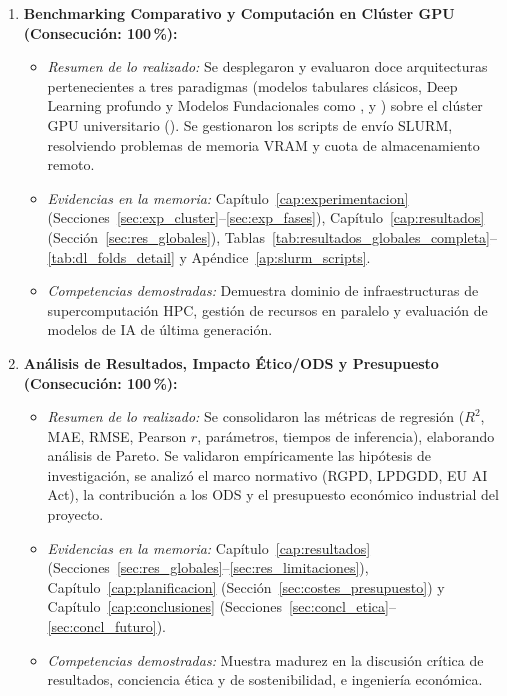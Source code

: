 \begin{enumerate}[label=\textbf{OE\arabic*.}, leftmargin=1.8cm]
    \item \textbf{Benchmarking Comparativo y Computación en Clúster GPU (Consecución: 100\,\%):}
    \begin{itemize}
        \item \textit{Resumen de lo realizado:} Se desplegaron y evaluaron doce arquitecturas pertenecientes a tres paradigmas (modelos tabulares clásicos, Deep Learning profundo y Modelos Fundacionales como \moment{}, \chronos{} y \timesfm{}) sobre el clúster GPU universitario (). Se gestionaron los scripts de envío SLURM, resolviendo problemas de memoria VRAM y cuota de almacenamiento remoto.
        \item \textit{Evidencias en la memoria:} Capítulo~\ref{cap:experimentacion} (Secciones~\ref{sec:exp_cluster}--\ref{sec:exp_fases}), Capítulo~\ref{cap:resultados} (Sección~\ref{sec:res_globales}), Tablas~\ref{tab:resultados_globales_completa}--\ref{tab:dl_folds_detail} y Apéndice~\ref{ap:slurm_scripts}.
        \item \textit{Competencias demostradas:} Demuestra dominio de infraestructuras de supercomputación HPC, gestión de recursos en paralelo y evaluación de modelos de IA de última generación.
    \end{itemize}

    \item \textbf{Análisis de Resultados, Impacto Ético/ODS y Presupuesto (Consecución: 100\,\%):}
    \begin{itemize}
        \item \textit{Resumen de lo realizado:} Se consolidaron las métricas de regresión ($R^2$, MAE, RMSE, Pearson $r$, parámetros, tiempos de inferencia), elaborando análisis de Pareto. Se validaron empíricamente las hipótesis de investigación, se analizó el marco normativo (RGPD, LPDGDD, EU AI Act), la contribución a los ODS y el presupuesto económico industrial del proyecto.
        \item \textit{Evidencias en la memoria:} Capítulo~\ref{cap:resultados} (Secciones~\ref{sec:res_globales}--\ref{sec:res_limitaciones}), Capítulo~\ref{cap:planificacion} (Sección~\ref{sec:costes_presupuesto}) y Capítulo~\ref{cap:conclusiones} (Secciones~\ref{sec:concl_etica}--\ref{sec:concl_futuro}).
        \item \textit{Competencias demostradas:} Muestra madurez en la discusión crítica de resultados, conciencia ética y de sostenibilidad, e ingeniería económica.
    \end{itemize}
\end{enumerate}

